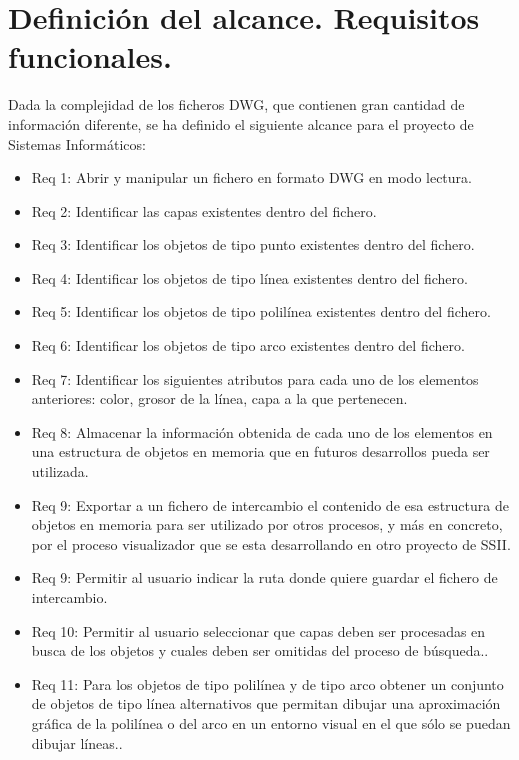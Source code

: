 \section{Definición del alcance. Requisitos funcionales.}

Dada la complejidad de los ficheros DWG, que contienen gran cantidad de información diferente, se ha definido el siguiente alcance para el proyecto de Sistemas Informáticos:


\begin{itemize}

\item{Req 1: Abrir y manipular un fichero en formato DWG en modo lectura.}
\item{Req 2: Identificar las capas existentes dentro del fichero.}
\item{Req 3: Identificar los objetos de tipo punto existentes dentro del fichero.}
\item{Req 4: Identificar los objetos de tipo línea existentes dentro del fichero.}
\item{Req 5: Identificar los objetos de tipo polilínea existentes dentro del fichero.}
\item{Req 6: Identificar los objetos de tipo arco existentes dentro del fichero.}
\item{Req 7: Identificar los siguientes atributos para cada uno de los elementos anteriores: color, grosor de la línea, capa a la que pertenecen}.
\item{Req 8: Almacenar la información obtenida de cada uno de los elementos en una estructura de objetos en memoria que en futuros desarrollos pueda ser utilizada}.
\item{Req 9: Exportar a un fichero de intercambio el contenido de esa estructura de objetos en memoria para ser utilizado por otros procesos, y más en concreto, por el proceso visualizador que se esta desarrollando en otro proyecto de SSII.}
\item{Req 9: Permitir al usuario indicar la ruta donde quiere guardar el fichero de intercambio}.
\item{Req 10: Permitir al usuario seleccionar que capas deben ser procesadas en busca de los objetos y cuales deben ser omitidas del proceso de búsqueda.}.
\item{Req 11: Para los objetos de tipo polilínea y de tipo arco obtener un conjunto de objetos de tipo línea alternativos que permitan dibujar una aproximación gráfica de la polilínea o del arco en un entorno visual en el que sólo se puedan dibujar líneas.}.

\end{itemize}
